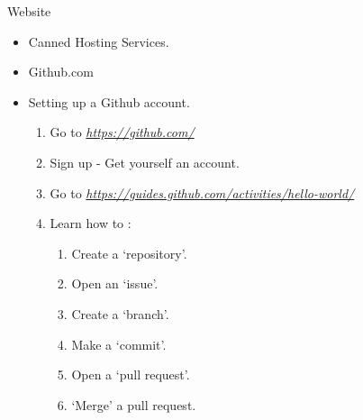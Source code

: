 \documentclass{beamer}
\begin{document}
\begin{frame}{Website}
\begin{itemize}
	\item Canned Hosting Services. \pause
	\item Github.com \pause
	\item Setting up a Github account. \pause
	\begin{enumerate} 
			\item Go to \emph{\href{https://github.com/}{https://github.com/}} \pause
			\item Sign up - Get yourself an account. \pause
			\item Go to \emph{\href{https://guides.github.com/activities/hello-world/}{https://guides.github.com/activities/hello-world/}} \pause
			\item Learn how to :
			\begin{enumerate}
				\item Create a `repository'.
				\item Open an `issue'.
				\item Create a `branch'.
				\item Make a `commit'.
				\item Open a `pull request'.
				\item `Merge' a pull request.
			\end{enumerate}
	\end{enumerate}
\end{itemize}
\end{frame}
\end{document}

